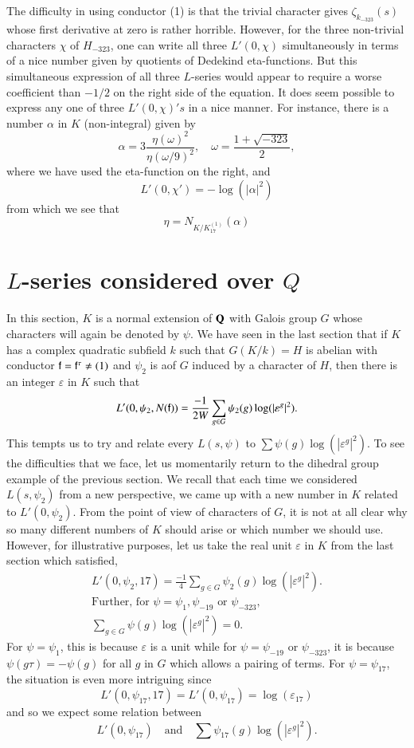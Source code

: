 The difficulty in using conductor (1) is that the trivial character gives $\zeta_{k_{-323}} (s)$ whose first derivative at zero is rather horrible. However, for the three non-trivial characters $\chi$ of $H_{-323}$, one can write all three $L' (0, \chi)$ simultaneously in terms of a nice number given by quotients of Dedekind eta-functions. But this simultaneous expression of all three $L$-series would appear to require a worse coefficient than $-1/2$ on the right side of the equation. It does seem possible to express any one of three $L' (0, \chi)'s$ in a nice manner. For instance, there is a number $\alpha$ in $K$ (non-integral) given by
$$
\alpha = 3 \frac{\eta(\omega)^2}{\eta(\omega/9)^2}, \quad \omega = \frac{1+\sqrt{-323}}{2},
$$
where we have used the eta-function on the right, and 
$$
L' (0, \chi') = - \log (|\alpha|^2)
$$
from which we see that 
$$
\eta = N_{K/K^{(1)}_{17}} (\alpha)
$$

\section{$L$-series considered over $Q$}\label{art9-sec3} 
In this section, $K$ is a normal extension of $\mathbf{Q}$ with Galois group $G$ whose characters will again be denoted by $\psi$. We have seen in the last section that if $K$ has a complex quadratic subfield $k$ such that $G (K/k) = H$ is abelian with conductor $\mathsf{f} = \mathsf{f}^\tau \neq (1)$ and $\psi_2$ is a\pageoriginale of $G$ induced by a character of $H$, then there is an integer $\varepsilon$ in $K$ such that 
$$
L'(0, \psi_2, N (\mathsf{f})) =\frac{-1}{2W} \sum\limits_{g \in G} \psi_2 (g) \log (|\varepsilon^g|^2).
$$
This tempts us to try and relate every $L (s, \psi)$ to $\sum \psi (g) \log (|\varepsilon^g|^2)$.
To see the difficulties that we face, let us momentarily return to the dihedral group example of the previous section. We recall that each time we considered $L(s, \psi_2)$ from a new perspective, we came up with a new number in $K$ related to $L' (0, \psi_2)$. From  the point of view of characters of $G$, it is not at all clear why so many different numbers of $K$ should arise or which number we should use. However, for illustrative purposes, let us take the real unit $\varepsilon$ in $K$ from the last section which satisfied,
\begin{gather*}
L' (0, \psi_2, 17) = \frac{-1}{4} \sum\limits_{g \in G} \psi_2 (g) \log (|\varepsilon^g|^2).\\
\text{Further, for } \psi = \psi_1, \psi_{-19} \text{ or } \psi_{-323},\\
\sum\limits_{g \in G} \psi (g) \log (|\varepsilon^g|^2) = 0.
\end{gather*}
For $\psi = \psi_1$, this is because $\varepsilon$ is a unit while for $\psi = \psi_{-19}$ or $\psi_{-323}$, it is because $\psi (g\tau) = - \psi (g)$ for all $g$ in $G$ which allows a pairing of terms. For $\psi = \psi_{17}$, the situation is even more intriguing since 
$$
L' (0, \psi_{17}, 17) = L' (0, \psi_{17}) = \log (\varepsilon_{17})
$$
and so we expect some relation between 
$$
L' (0, \psi_{17})\quad\text{and}\quad \sum \psi_{17} (g) \log (|\varepsilon^g|^2).
$$

